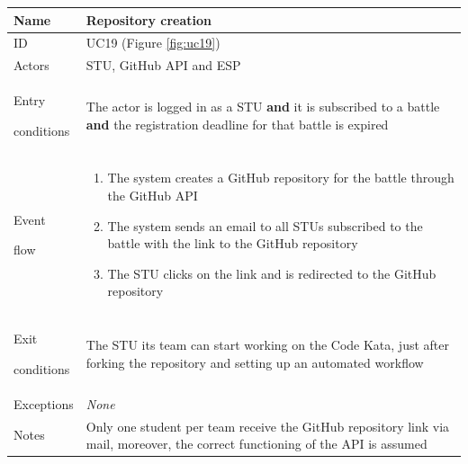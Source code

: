 \begin{center}
    \def\arraystretch{1.5}
    \begin{tabular}{| m{2cm} | m{10cm}|}
        \hline
        Name                  & Repository creation                                                                                                                                     \\ \hline
        ID                    & UC19 (Figure \ref{fig:uc19})                                                                                                                            \\ \hline
        Actors                & STU, GitHub API and ESP                                                                                                                                 \\ \hline
        Entry \par conditions & The actor is logged in as a STU \textbf{and} it is subscribed to a battle \textbf{and} the registration deadline for that battle is expired             \\ \hline
        Event \par flow       & \begin{enumerate}
                                    \item The system creates a GitHub repository for the battle through the GitHub API
                                    \item The system sends an email to all STUs subscribed to the battle with the link to the GitHub repository
                                    \item The STU clicks on the link and is redirected to the GitHub repository
                                \end{enumerate} \\ \hline
        Exit \par conditions  & The STU its team can start working on the Code Kata, just after forking the repository and setting up an automated workflow                             \\ \hline
        Exceptions            & \textit{None}                                                                                                                                           \\ \hline
        Notes                 & Only one student per team receive the GitHub repository link via mail, moreover, the correct functioning of the API is assumed                          \\ \hline
    \end{tabular}
\end{center}

